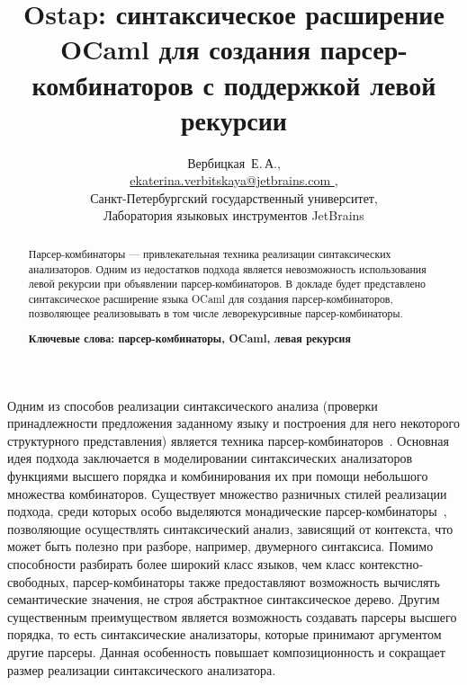 \documentclass [a4paper] {article}
\begin{document}
\title{Ostap: синтаксическое расширение OCaml для создания парсер-комбинаторов с поддержкой левой рекурсии}
\author{
  Вербицкая~Е.\,А., \\ \url {ekaterina.verbitskaya@jetbrains.com }, \\
  Санкт-Петербургский государственный университет, \\
  Лаборатория языковых инструментов JetBrains 
}

\maketitle

\begin{abstract}
Парсер-комбинаторы --- привлекательная техника реализации синтаксических анализаторов. Одним из недостатков подхода является невозможность использования левой рекурсии при объявлении парсер-комбинаторов. В докладе будет представлено синтаксическое расширение языка OCaml для создания парсер-комбинаторов, позволяющее реализовывать в том числе леворекурсивные парсер-комбинаторы.

\vspace{1em}
\textbf{Ключевые слова: парсер-комбинаторы, OCaml, левая рекурсия}  
\end{abstract}

Одним из способов реализации синтаксического анализа (проверки принадлежности предложения заданному языку и построения для него некоторого структурного представления) является техника парсер-комбинаторов~\cite{hutton1992higher}. Основная идея подхода заключается в моделировании синтаксических анализаторов функциями высшего порядка и комбинирования их при помощи небольшого множества комбинаторов. Существует множество разничных стилей реализации подхода, среди которых особо выделяются монадические парсер-комбинаторы~\cite{nott237}, позволяющие осуществлять синтаксический анализ, зависящий от контекста, что может быть полезно при разборе, например, двумерного синтаксиса. Помимо способности разбирать более широкий класс языков, чем класс контекстно-свободных, парсер-комбинаторы также предоставляют возможность вычислять семантические значения, не строя абстрактное синтаксическое дерево. Другим существенным преимуществом является возможность создавать парсеры высшего порядка, то есть синтаксические анализаторы, которые принимают аргументом другие парсеры. Данная особенность повышает композиционность и сокращает размер реализации синтаксического анализатора. 
\end{document}
